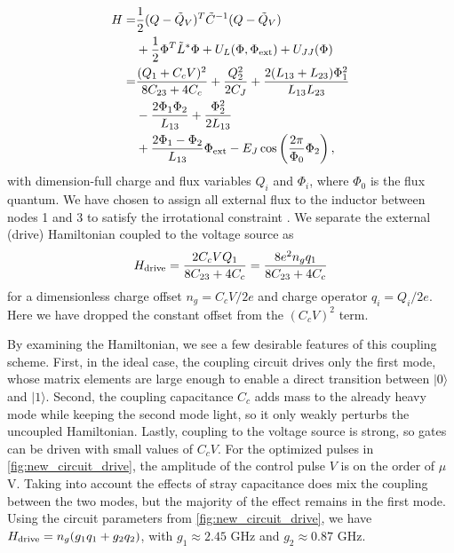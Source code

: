 \begin{align}
    H = &\frac{1}{2}(Q - \tilde{Q}_V)^T \tilde{C}^{-1}(Q - \tilde{Q}_V) \nonumber \\
        &+\frac{1}{2}\Phi^T\tilde{L}^*\Phi + U_{L}(\Phi, \Phi_{\rm ext}) +  U_{JJ}(\Phi) \nonumber \\
      = & \frac{(Q_1 + C_cV)^2}{8 C_{23} + 4C_c} + \frac{Q_2^2}{2C_J}  + \frac{2(L_{13} + L_{23})\Phi_1^2}{L_{13}L_{23}} \nonumber \\
      &- \frac{2\Phi_1\Phi_2}{L_{13}} + \frac{\Phi_2^2}{2L_{13}} \nonumber \\
      &+ \frac{2\Phi_1-\Phi_2}{L_{13}}\Phi_{\rm ext} - E_J\cos\left (\frac{2\pi}{\Phi_0}\Phi_2\right),
\end{align}
with dimension-full charge and flux variables $Q_i$ and $\Phi_i$, where $\Phi_0$ is the flux quantum. We have chosen to assign all external flux to the inductor between nodes 1 and 3 to satisfy the irrotational constraint \cite{YouKoch2019,BryonExtFlux2023}. We separate the external (drive) Hamiltonian coupled to the voltage source as 
\begin{align}
H_{\rm drive} = \frac{2C_cVQ_1}{8 C_{23} + 4C_c} = \frac{8 e^2 n_gq_1}{{8 C_{23} + 4C_c}}
\end{align}
for a dimensionless charge offset $n_g = C_cV/2e$ and charge operator $q_i = Q_i/2e$.
Here we have dropped the constant offset from the $(C_cV)^2$ term.



By examining the Hamiltonian, we see a few desirable features of this coupling scheme. First, in the ideal case, the coupling circuit drives only the first mode, whose matrix elements are large enough to enable a direct transition between $|0\rangle$ and $|1\rangle$. Second, the coupling capacitance $C_c$ adds mass to the already heavy mode while keeping the second mode light, so it only weakly perturbs the uncoupled Hamiltonian.
Lastly, coupling to the voltage source is strong, so gates can be driven with small values of $C_c V$. For the optimized pulses in \cref{fig:new_circuit_drive}, the amplitude of the control pulse $V$ is on the order of $\mu$V. Taking into account the effects of stray capacitance does mix the coupling between the two modes, but the majority of the effect remains in the first mode. Using the circuit parameters from \cref{fig:new_circuit_drive}, we have $H_{\rm drive} = n_g(g_1q_1 + g_2q_2)$, with $g_1 \approx 2.45$ GHz and $g_2 \approx 0.87$ GHz.

